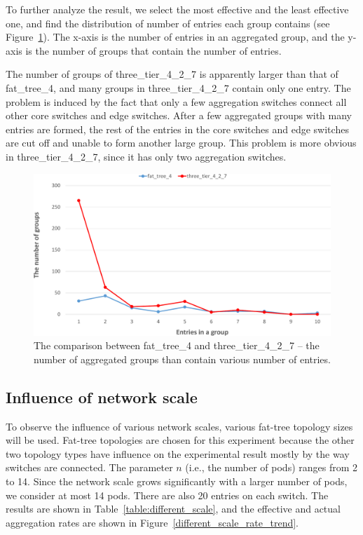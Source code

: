 \documentclass[conference]{IEEEtran}
\begin{document}
To further analyze the result, we select the most effective and the least effective one, and find the distribution of number of entries each group contains (see Figure~\ref{different_topo_distribute}). The x-axis is the number of entries in an aggregated group, and the y-axis is the number of groups that contain the number of entries.

The number of groups of three\_tier\_4\_2\_7 is apparently larger than that of fat\_tree\_4, and many groups in three\_tier\_4\_2\_7 contain only one entry. The problem is induced by the fact that only a few aggregation switches connect all other core switches and edge switches. After a few aggregated groups with many entries are formed, the rest of the entries in the core switches and edge switches are cut off and unable to form another large group. This problem is more obvious in three\_tier\_4\_2\_7, since it has only two aggregation switches. 

\begin{figure}[ht]
\centering 
\includegraphics[width=1\linewidth]{figures/exp_topotype_distribute.pdf}
\caption{The comparison between fat\_tree\_4 and three\_tier\_4\_2\_7 -- the number of aggregated groups than contain various number of entries.}
\label{different_topo_distribute}
\end{figure}

\subsection{Influence of network scale}
To observe the influence of various network scales, various fat-tree topology sizes will be used. Fat-tree topologies are chosen for this experiment because the other two topology types have influence on the experimental result mostly by the way switches are connected. The parameter $n$ (i.e., the number of pods) ranges from 2 to 14. Since the network scale grows significantly with a larger number of pods, we consider at most 14 pods. There are also 20 entries on each switch. The results are shown in Table~\ref{table:different_scale}, and the effective and actual aggregation rates are shown in Figure~\ref{different_scale_rate_trend}.
\end{document}

